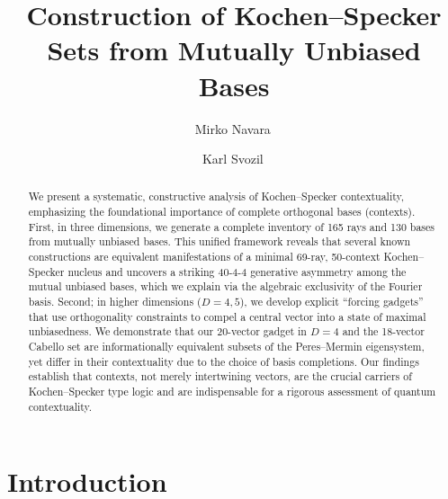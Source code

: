 \documentclass[%
  reprint,
  superscriptaddress,
  showpacs,
  showkeys,
  amsmath,amssymb,
  pra,
  longbibliography,
  floatfix,
  x11names
]{revtex4-2}
\begin{document}
\title{Construction of Kochen--Specker Sets from Mutually Unbiased Bases}

\author{Mirko Navara\,}


\author{Karl Svozil\,}


\begin{abstract}
We present a systematic, constructive analysis of Kochen--Specker contextuality, emphasizing the foundational importance of complete orthogonal bases (contexts). First, in three dimensions, we generate a complete inventory of 165 rays and 130 bases from mutually unbiased bases. This unified framework reveals that several known constructions are equivalent manifestations of a minimal 69-ray, 50-context Kochen--Specker nucleus and uncovers a striking 40-4-4 generative asymmetry among the mutual unbiased bases, which we explain via the algebraic exclusivity of the Fourier basis. Second; in higher dimensions ($D=4, 5$), we develop explicit ``forcing gadgets'' that use orthogonality constraints to compel a central vector into a state of maximal unbiasedness. We demonstrate that our 20-vector gadget in $D=4$ and the 18-vector Cabello set are informationally equivalent subsets of the Peres--Mermin eigensystem, yet differ in their contextuality due to the choice of basis completions. Our findings establish that contexts, not merely intertwining vectors, are the crucial carriers of Kochen--Specker type logic and are indispensable for a rigorous assessment of quantum contextuality.
\end{abstract}


\maketitle



\section{Introduction}
\end{document}
